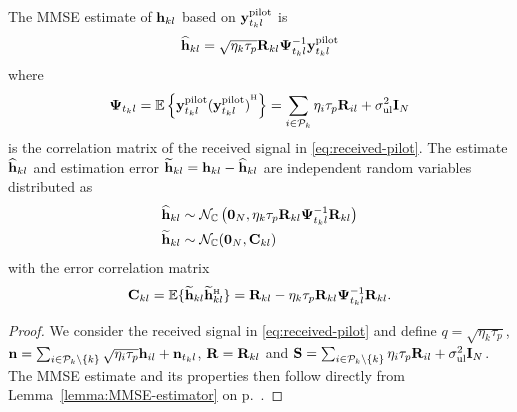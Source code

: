 \enlargethispage{\baselineskip} 

\begin{corollary} \label{cor:MMSE-estimation}
The \gls{MMSE} estimate of $\mathbf{h}_{kl}$ based on $\mathbf{y}_{t_kl}^{{\rm pilot}}$ is
\begin{equation} \label{eq:estimates}
\widehat{\mathbf{h}}_{kl} = \sqrt{\eta_k \tau_p} \mathbf{R}_{kl} \mathbf{\Psi}_{t_kl}^{-1} \mathbf{y}_{t_kl}^{{\rm pilot}}  
\end{equation}
where
\begin{equation} \label{eq:Psitl}
\vect{\Psi}_{t_kl} = \mathbb{E} \left\{ \vect{y}_{t_kl}^{{\rm pilot}} {(\vect{y}_{t_kl}^{{\rm pilot}})}^{\Htran} \right\} = \sum_{i \in \mathcal{P}_k} \eta_i\tau_p \vect{R}_{il} + \sigmaUL \vect{I}_{N}
\end{equation}
is the correlation matrix of the received signal in \eqref{eq:received-pilot}.
The estimate $\widehat{\mathbf{h}}_{kl}$ and estimation error $\widetilde{\mathbf{h}}_{kl} = \mathbf{h}_{kl} - \widehat{\mathbf{h}}_{kl}$ are independent random variables distributed as
\begin{align} \label{eq:estimate-distribution}
\widehat{\mathbf{h}}_{kl} &\sim \mathcal{N}_{\mathbb{C}} \left( \mathbf{0}_N, \eta_k \tau_p \mathbf{R}_{kl} \mathbf{\Psi}_{t_kl}^{-1} \mathbf{R}_{kl} \right) \\
\widetilde{\mathbf{h}}_{kl} &\sim \mathcal{N}_{\mathbb{C}}(\mathbf{0}_N,\mathbf{C}_{kl})
\end{align}
with the error correlation matrix
\begin{equation} \label{eq:error-correlation}
\vect{C}_{kl} = \mathbb{E} \{ \widetilde{\vect{h}}_{kl} \widetilde{\vect{h}}_{kl}^{\Htran} \}= \vect{R}_{kl} - \eta_k \tau_p \vect{R}_{kl} \vect{\Psi}_{t_kl}^{-1} \vect{R}_{kl}.
\end{equation} 
\end{corollary}
\begin{proof}
We consider the received signal in \eqref{eq:received-pilot} and define $q = \sqrt{\eta_k \tau_p} $, ${\bf n} = \sum_{i \in \mathcal{P}_k\setminus \{k \}} \sqrt{\eta_i \tau_p } \mathbf{h}_{il} + \mathbf{n}_{t_k l}$, ${\bf R} = {\bf R}_{kl}$ and ${\bf S} = \sum_{i \in \mathcal{P}_k\setminus \{k \}}\eta_i\tau_p \mathbf{R}_{il} + \sigma^2_{\mathrm{ul}} \mathbf{I}_{N}$. The MMSE estimate and its properties then follow directly from Lemma~\ref{lemma:MMSE-estimator} on p.~\pageref{lemma:MMSE-estimator}.
\end{proof}

